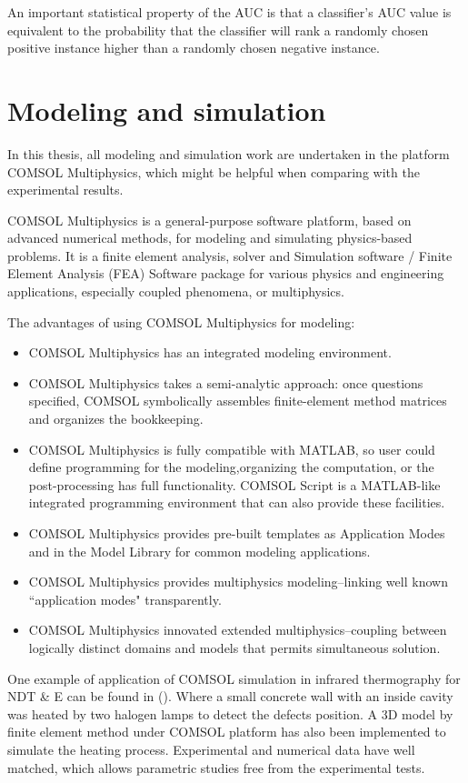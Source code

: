 An important statistical property of the AUC is that a classifier's AUC value is equivalent to the probability that the classifier will rank a randomly chosen positive instance higher than a randomly chosen negative instance. 

\section{Modeling and simulation}
In this thesis, all modeling and simulation work are undertaken in the platform COMSOL Multiphysics{\textregistered}, which might be helpful when comparing with the experimental results.

COMSOL Multiphysics is a general-purpose software platform, based on advanced numerical methods, for modeling and simulating physics-based problems. It is a finite element analysis, solver and Simulation software / Finite Element Analysis (FEA) Software package for various physics and engineering applications, especially coupled phenomena, or multiphysics.

The advantages of using COMSOL Multiphysics for modeling:
\begin{itemize}
	\item COMSOL Multiphysics has an integrated modeling environment.
	\item COMSOL Multiphysics takes a semi-analytic approach: once questions specified, COMSOL symbolically assembles finite-element method matrices and organizes the bookkeeping.
	\item COMSOL Multiphysics is fully compatible with MATLAB, so user could define programming for the modeling,organizing the computation, or the post-processing has full functionality. COMSOL Script is a MATLAB-like integrated programming environment that can also provide these facilities.
	\item COMSOL Multiphysics provides pre-built templates as Application Modes and in the Model Library for common modeling applications.
	\item COMSOL Multiphysics provides multiphysics modeling--linking well known ``application modes" transparently.
	\item COMSOL Multiphysics innovated extended multiphysics--coupling between logically distinct domains and models that permits simultaneous solution.
\end{itemize}


One example of application of COMSOL simulation in infrared thermography for NDT \& E can be found in (\citet{Cannas2012Modeling}). Where a small concrete wall with an inside cavity was heated by two halogen lamps to detect the defects position. A 3D model by finite element method under COMSOL platform has also been implemented to simulate the heating process. Experimental and numerical data have well matched, which allows parametric studies free from the experimental tests.

 
